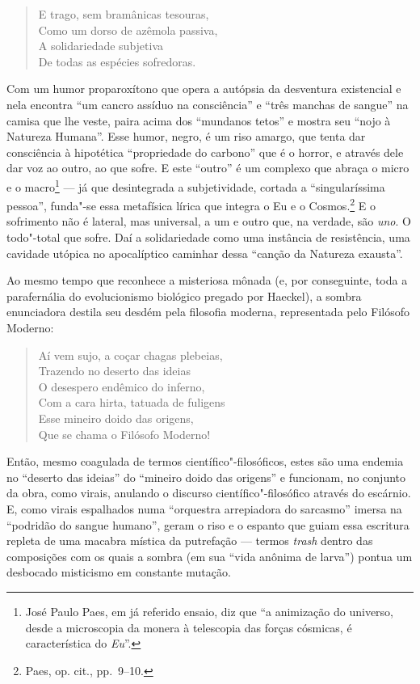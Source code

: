 \begin{verse}
E trago, sem bramânicas tesouras,\\
Como um dorso de azêmola passiva,\\
A solidariedade subjetiva\\
De todas as espécies sofredoras.
\end{verse}

Com um humor proparoxítono que opera a autópsia da desventura
existencial e nela encontra “um cancro assíduo na consciência” e “três
manchas de sangue” na camisa que lhe veste, paira acima dos “mundanos
tetos” e mostra seu “nojo à Natureza Humana”. Esse humor, negro, é um
riso amargo, que tenta dar consciência à hipotética “propriedade do
carbono” que é o horror, e através dele dar voz ao outro, ao que sofre.
E este “outro” é um complexo que abraça o micro e o macro\footnote{
José Paulo Paes, em já referido ensaio, diz que “a animização do
universo, desde a microscopia da monera à telescopia das forças
cósmicas, é característica do \textit{Eu}”.} --- já que desintegrada a
subjetividade, cortada a “singularíssima pessoa”, funda"-se essa
metafísica lírica que integra o Eu e o Cosmos.\footnote{Paes, op. cit., pp.~9--10.} E o
sofrimento não é lateral, mas universal, a um e outro que, na verdade,
são \textit{uno}. O todo"-total que sofre. Daí a solidariedade como uma
instância de resistência, uma cavidade utópica no apocalíptico caminhar
dessa “canção da Natureza exausta”. 

Ao mesmo tempo que reconhece a misteriosa mônada (e, por
conseguinte, toda a parafernália do evolucionismo biológico pregado por
Haeckel), a sombra enunciadora destila seu desdém pela filosofia
moderna, representada pelo Filósofo Moderno:

\begin{verse}
Aí vem sujo, a coçar chagas plebeias,\\
Trazendo no deserto das ideias\\
O desespero endêmico do inferno,\\
Com a cara hirta, tatuada de fuligens\\
Esse mineiro doido das origens,\\
Que se chama o Filósofo Moderno!
\end{verse}

Então, mesmo coagulada de termos científico"-filosóficos, estes são
uma endemia no “deserto das ideias” do “mineiro doido das origens” e
funcionam, no conjunto da obra, como virais, anulando o discurso
científico"-filosófico através do escárnio. E, como virais espalhados
numa “orquestra arrepiadora do sarcasmo” imersa na “podridão do sangue
humano”, geram o riso e o espanto que guiam essa escritura repleta
de uma macabra mística da putrefação --- termos \textit{trash} dentro das
composições com os quais a sombra (em sua “vida anônima de larva”)
pontua um desbocado misticismo em constante mutação. 

